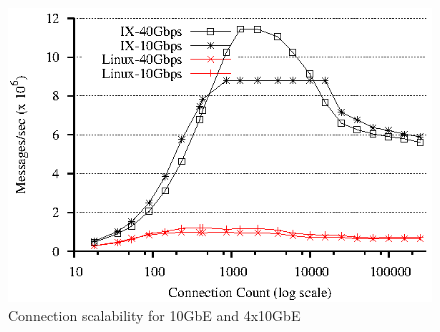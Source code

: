 
\begin{figure}
\begin{centering}
\includegraphics{figs/connscaling-throughput.eps}
\caption{Connection scalability for 10GbE and 4x10GbE}
\label{fig:connscaling}
\end{centering}
\end{figure}

